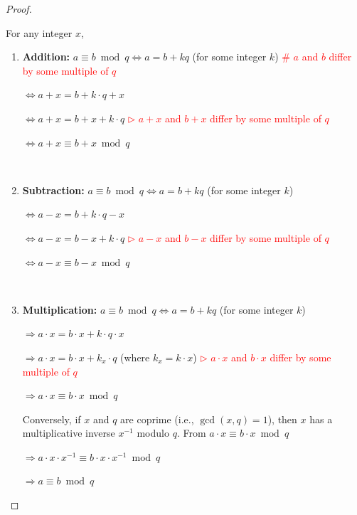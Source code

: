\begin{proof}

$ $

For any integer $x$,

\begin{enumerate}


\item \textbf{Addition:} $a \equiv b \bmod q \Longleftrightarrow a = b + k q $ (for some integer $k$) \textcolor{red}{ \text{ } \# $a$ and $b$ differ by some multiple of $q$}

$\Longleftrightarrow a + x = b + k\cdot q + x$

$\Longleftrightarrow a + x = b + x + k\cdot q$ \textcolor{red}{ $\rhd$ $a+x$ and $b+x$ differ by some multiple of $q$}

$\Longleftrightarrow a + x \equiv b + x \bmod q$

$ $

\item \textbf{Subtraction:} $a \equiv b \bmod q \Longleftrightarrow a = b + k q $ (for some integer $k$)

$\Longleftrightarrow a - x = b + k\cdot q - x$

$\Longleftrightarrow a - x = b - x + k\cdot q$  \textcolor{red}{ $\rhd$ $a-x$ and $b-x$ differ by some multiple of $q$}

$\Longleftrightarrow a - x \equiv b - x \bmod q$

$ $

\item \textbf{Multiplication:} $a \equiv b \bmod q \Longleftrightarrow a = b + k q $ (for some integer $k$)

$\Longrightarrow a \cdot x = b \cdot x + k\cdot q \cdot x$

$\Longrightarrow a \cdot x = b \cdot x + k_x\cdot q$ (where $k_x = k \cdot x$)  \textcolor{red}{ $\rhd$ $a\cdot x$ and $b\cdot x$ differ by some multiple of $q$}

$\Longrightarrow a \cdot x \equiv b \cdot x \bmod q$

Conversely, if $x$ and $q$ are coprime (i.e., $\gcd(x,q)=1$), then $x$ has a multiplicative inverse $x^{-1}$ modulo $q$. From $a \cdot x \equiv b \cdot x \bmod q$

$\Longrightarrow a \cdot x \cdot x^{-1} \equiv b \cdot x \cdot x^{-1} \bmod q$

$\Longrightarrow a \equiv b \bmod q$

\end{enumerate}
\end{proof}

